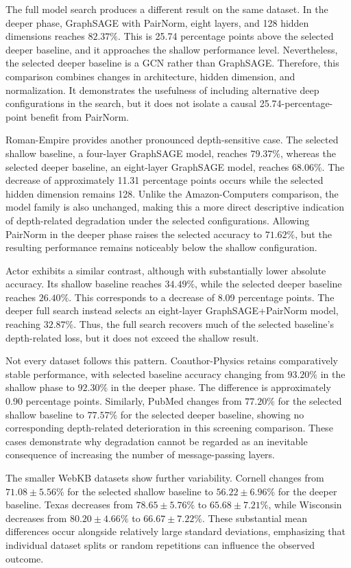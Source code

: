 \documentclass[english]{lni}
\begin{document}
The full model search produces a different result on the same dataset. In the deeper phase, GraphSAGE with PairNorm, eight layers, and 128 hidden dimensions reaches $82.37\%$. This is 25.74 percentage points above the selected deeper baseline, and it approaches the shallow performance level. Nevertheless, the selected deeper baseline is a GCN rather than GraphSAGE. Therefore, this comparison combines changes in architecture, hidden dimension, and normalization. It demonstrates the usefulness of including alternative deep configurations in the search, but it does not isolate a causal 25.74-percentage-point benefit from PairNorm.

Roman-Empire provides another pronounced depth-sensitive case. The selected shallow baseline, a four-layer GraphSAGE model, reaches $79.37\%$, whereas the selected deeper baseline, an eight-layer GraphSAGE model, reaches $68.06\%$. The decrease of approximately 11.31 percentage points occurs while the selected hidden dimension remains 128. Unlike the Amazon-Computers comparison, the model family is also unchanged, making this a more direct descriptive indication of depth-related degradation under the selected configurations. Allowing PairNorm in the deeper phase raises the selected accuracy to $71.62\%$, but the resulting performance remains noticeably below the shallow configuration.

Actor exhibits a similar contrast, although with substantially lower absolute accuracy. Its shallow baseline reaches $34.49\%$, while the selected deeper baseline reaches $26.40\%$. This corresponds to a decrease of 8.09 percentage points. The deeper full search instead selects an eight-layer GraphSAGE+PairNorm model, reaching $32.87\%$. Thus, the full search recovers much of the selected baseline's depth-related loss, but it does not exceed the shallow result.

Not every dataset follows this pattern. Coauthor-Physics retains comparatively stable performance, with selected baseline accuracy changing from $93.20\%$ in the shallow phase to $92.30\%$ in the deeper phase. The difference is approximately 0.90 percentage points. Similarly, PubMed changes from $77.20\%$ for the selected shallow baseline to $77.57\%$ for the selected deeper baseline, showing no corresponding depth-related deterioration in this screening comparison. These cases demonstrate why degradation cannot be regarded as an inevitable consequence of increasing the number of message-passing layers.

The smaller WebKB datasets show further variability. Cornell changes from $71.08\pm5.56\%$ for the selected shallow baseline to $56.22\pm6.96\%$ for the deeper baseline. Texas decreases from $78.65\pm5.76\%$ to $65.68\pm7.21\%$, while Wisconsin decreases from $80.20\pm4.66\%$ to $66.67\pm7.22\%$. These substantial mean differences occur alongside relatively large standard deviations, emphasizing that individual dataset splits or random repetitions can influence the observed outcome.
\end{document}
